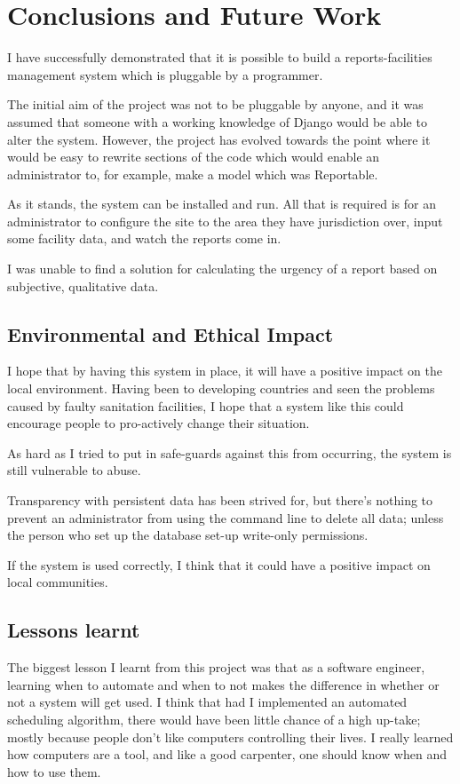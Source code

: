 \chapter{Conclusions and Future Work}

I have successfully demonstrated that it is possible to build a reports-facilities management system which is pluggable by a programmer.

The initial aim of the project was not to be pluggable by anyone, and it was assumed that someone with a working knowledge of Django would be able to alter the system. However, the project has evolved towards the point where it would be easy to rewrite sections of the code which would enable an administrator to, for example, make a model which was Reportable.

As it stands, the system can be installed and run. All that is required is for an administrator to configure the site to the area they have jurisdiction over, input some facility data, and watch the reports come in.

I was unable to find a solution for calculating the urgency of a report based on subjective, qualitative data.

\section{Environmental and Ethical Impact}
I hope that by having this system in place, it will have a positive impact on the local environment. Having been to developing countries and seen the problems caused by faulty sanitation facilities, I hope that a system like this could encourage people to pro-actively change their situation.

As hard as I tried to put in safe-guards against this from occurring, the system is still vulnerable to abuse.

Transparency with persistent data has been strived for, but there's nothing to prevent an administrator from using the command line to delete all data; unless the person who set up the database set-up write-only permissions.

If the system is used correctly, I think that it could have a positive impact on local communities.

\section{Lessons learnt}
The biggest lesson I learnt from this project was that as a software engineer, learning when to automate and when to not makes the difference in whether or not a system will get used. I think that had I implemented an automated scheduling algorithm, there would have been little chance of a high up-take; mostly because people don't like computers controlling their lives. I really learned how computers are a tool, and like a good carpenter, one should know when and how to use them.

